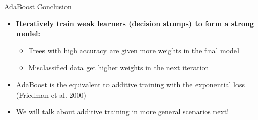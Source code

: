 \begin{frame}{AdaBoost Conclusion}
\begin{itemize}
    \item \textbf{Iteratively train weak learners (decision stumps) to form a strong model:}
    \begin{itemize}
        \item Trees with high accuracy are given more weights in the final model
        \item Misclassified data get higher weights in the next iteration
    \end{itemize}

    \item AdaBoost is the equivalent to additive training with the exponential loss (Friedman et al. 2000)

    \item We will talk about additive training in more general scenarios next!
\end{itemize}
\end{frame}